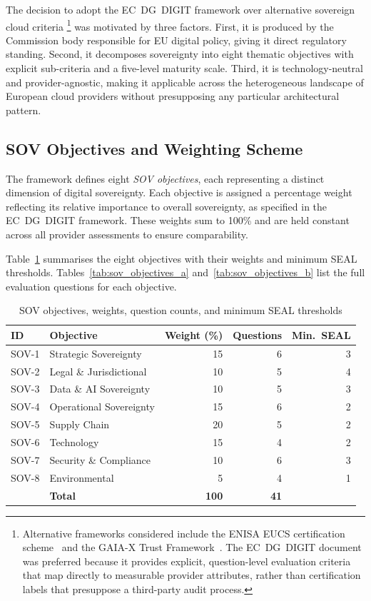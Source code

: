 The decision to adopt the EC~DG~DIGIT framework over alternative sovereign cloud criteria%
\footnote{Alternative frameworks considered include the ENISA EUCS certification scheme~\cite{ENISA_EUCS_2023} and the GAIA-X Trust Framework~\cite{GAIAX_Architecture_2023}. The EC~DG~DIGIT document was preferred because it provides explicit, question-level evaluation criteria that map directly to measurable provider attributes, rather than certification labels that presuppose a third-party audit process.}
was motivated by three factors. First, it is produced by the Commission body responsible for EU digital policy, giving it direct regulatory standing. Second, it decomposes sovereignty into eight thematic objectives with explicit sub-criteria and a five-level maturity scale. Third, it is technology-neutral and provider-agnostic, making it applicable across the heterogeneous landscape of European cloud providers without presupposing any particular architectural pattern.

\subsection{SOV Objectives and Weighting Scheme}
\label{subsec:sov_objectives}

The framework defines eight \textit{SOV objectives}, each representing a distinct dimension of digital sovereignty. Each objective is assigned a percentage weight reflecting its relative importance to overall sovereignty, as specified in the EC~DG~DIGIT framework. These weights sum to 100\% and are held constant across all provider assessments to ensure comparability.

Table~\ref{tab:sov_objectives} summarises the eight objectives with their weights and minimum SEAL thresholds. Tables~\ref{tab:sov_objectives_a} and~\ref{tab:sov_objectives_b} list the full evaluation questions for each objective.

\begin{table}[htbp]
\centering
\caption{SOV objectives, weights, question counts, and minimum SEAL thresholds}
\label{tab:sov_objectives}
\begin{tabular}{llrrr}
\toprule
\textbf{ID} & \textbf{Objective} & \textbf{Weight (\%)} & \textbf{Questions} & \textbf{Min.\ SEAL} \\
\midrule
SOV-1 & Strategic Sovereignty      & 15 & 6 & 3 \\
SOV-2 & Legal \& Jurisdictional    & 10 & 5 & 4 \\
SOV-3 & Data \& AI Sovereignty     & 10 & 5 & 3 \\
SOV-4 & Operational Sovereignty    & 15 & 6 & 2 \\
SOV-5 & Supply Chain               & 20 & 5 & 2 \\
SOV-6 & Technology                 & 15 & 4 & 2 \\
SOV-7 & Security \& Compliance     & 10 & 6 & 3 \\
SOV-8 & Environmental              &  5 & 4 & 1 \\
\midrule
       & \textbf{Total}             & \textbf{100} & \textbf{41} & \\
\bottomrule
\end{tabular}
\end{table}


